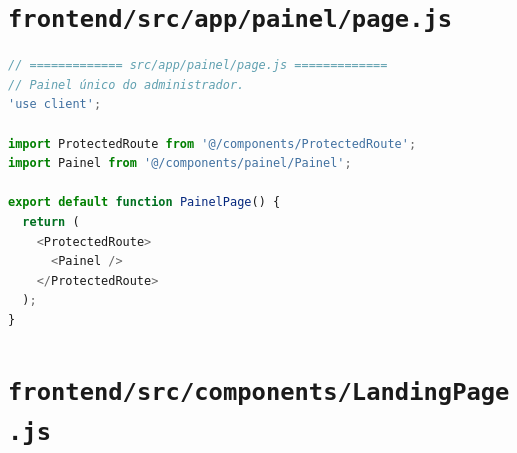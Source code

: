\section*{\texttt{frontend/src/app/painel/page.js}}
\begin{lstlisting}[language=JavaScript]
// ============= src/app/painel/page.js =============
// Painel único do administrador.
'use client';

import ProtectedRoute from '@/components/ProtectedRoute';
import Painel from '@/components/painel/Painel';

export default function PainelPage() {
  return (
    <ProtectedRoute>
      <Painel />
    </ProtectedRoute>
  );
}
\end{lstlisting}

\section*{\texttt{frontend/src/components/LandingPage.js}}
